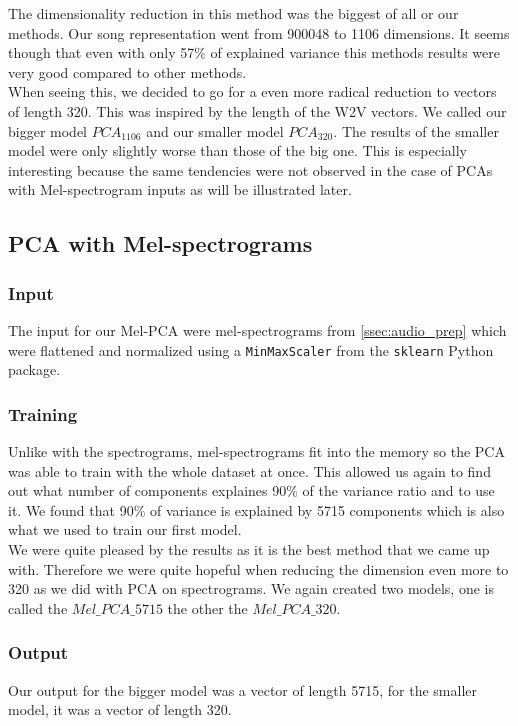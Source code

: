 The dimensionality reduction in this method was the biggest of all or our methods. Our song representation went from 900048 to 1106 dimensions. It seems though that even with only 57\% of explained variance this methods results were very good compared to other methods. \\
When seeing this, we decided to go for a even more radical reduction to vectors of length 320. This was inspired by the length of the W2V vectors. We called our bigger model $PCA_{1106}$ and our smaller model $PCA_{320}. $ The results of the smaller model were only slightly worse than those of the big one. This is especially interesting because the same tendencies were not observed in the case of PCAs with Mel-spectrogram inputs as will be illustrated later.

\subsection{PCA with Mel-spectrograms}
\subsubsection{Input}
The input for our Mel-PCA were mel-spectrograms from \ref{ssec:audio_prep} which were flattened and normalized using a \texttt{MinMaxScaler} from the \texttt{sklearn} Python package.

\subsubsection{Training}
Unlike with the spectrograms, mel-spectrograms fit into the memory so the PCA was able to train with the whole dataset at once. This allowed us again to find out what number of components explaines 90\% of the variance ratio and to use it. We found that 90\% of variance is explained by 5715 components which is also what we used to train our first model. \\
We were quite pleased by the results as it is the best method that we came up with. Therefore we were quite hopeful when reducing the dimension even more to 320 as we did with PCA on spectrograms. We again created two models, one is called the $Mel\_PCA\_5715$ the other the $Mel\_PCA\_320$. 

\subsubsection{Output}
Our output for the bigger model was a vector of length 5715, for the smaller model, it was a vector of length 320.

